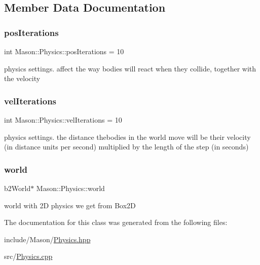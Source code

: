 \subsection{Member Data Documentation}
\hypertarget{class_mason_1_1_physics_a43a4f23b2ee62ad20c3ed54a7c75a468}{}\label{class_mason_1_1_physics_a43a4f23b2ee62ad20c3ed54a7c75a468} 
\subsubsection{\texorpdfstring{pos\+Iterations}{posIterations}}
{\footnotesize\ttfamily int Mason\+::\+Physics\+::pos\+Iterations = 10}



physics settings. affect the way bodies will react when they collide, together with the velocity 

\hypertarget{class_mason_1_1_physics_ab93e9c5caf8cb0964ceedc2161fac86d}{}\label{class_mason_1_1_physics_ab93e9c5caf8cb0964ceedc2161fac86d} 
\subsubsection{\texorpdfstring{vel\+Iterations}{velIterations}}
{\footnotesize\ttfamily int Mason\+::\+Physics\+::vel\+Iterations = 10}



physics settings. the distance thebodies in the world move will be their velocity (in distance units per second) multiplied by the length of the step (in seconds) 

\hypertarget{class_mason_1_1_physics_a76c12a9fcecf8ff84953c1a5841e6f56}{}\label{class_mason_1_1_physics_a76c12a9fcecf8ff84953c1a5841e6f56} 
\subsubsection{\texorpdfstring{world}{world}}
{\footnotesize\ttfamily b2\+World$\ast$ Mason\+::\+Physics\+::world}



world with 2D physics we get from Box2D 



The documentation for this class was generated from the following files\+:\begin{DoxyCompactItemize}
\item 
include/\+Mason/\hyperlink{_physics_8hpp}{Physics.\+hpp}\item 
src/\hyperlink{_physics_8cpp}{Physics.\+cpp}\end{DoxyCompactItemize}
